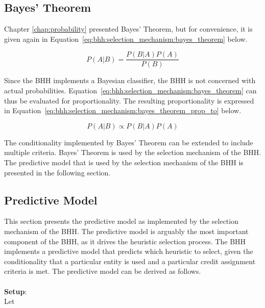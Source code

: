 \subsection{Bayes' Theorem}\label{sec:bhh:selection_mechanism:bayes_theorem}

Chapter \ref{chap:probability} presented Bayes' Theorem, but for convenience, it is given again in Equation~\eqref{eq:bhh:selection_mechanism:bayes_theorem} below.

\begin{equation}
      \label{eq:bhh:selection_mechanism:bayes_theorem}
      P(A \vert B) = \frac{P(B \vert A)P(A)}{P(B)}
\end{equation}

Since the \acs{BHH} implements a Bayesian classifier, the \acs{BHH} is not concerned with actual probabilities. Equation~\eqref{eq:bhh:selection_mechanism:bayes_theorem} can thus be evaluated for proportionality. The resulting proportionality is expressed in Equation~\eqref{eq:bhh:selection_mechanism:bayes_theorem_prop_to} below.

\begin{equation}
      \label{eq:bhh:selection_mechanism:bayes_theorem_prop_to}
      P(A \vert B) \propto P(B \vert A)P(A)
\end{equation}

The conditionality implemented by Bayes' Theorem can be extended to include multiple criteria. Bayes' Theorem is used by the selection mechanism of the \acs{BHH}. The predictive model that is used by the selection mechanism of the \acs{BHH} is presented in the following section.

\subsection{Predictive Model}\label{sec:bhh:selection_mechanism:predictive_model}

This section presents the predictive model as implemented by the selection mechanism of the \acs{BHH}. The predictive model is arguably the most important component of the \acs{BHH}, as it drives the heuristic selection process. The \acs{BHH} implements a predictive model that predicts which heuristic to select, given the conditionality that a particular entity is used and a particular credit assignment criteria is met. The predictive model can be derived as follows.\\\\
\textbf{Setup}:
\\
Let

